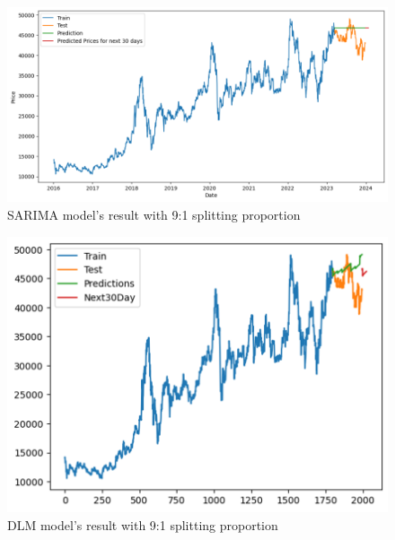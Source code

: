 \documentclass{ieeeojies}
\begin{document}
\begin{figure}[H]
  \centering
  \begin{minipage}{0.8\linewidth}
    \centering
    \includegraphics[width=\linewidth]{bibliography/SARIMA_BIDV91.png}
    \caption{SARIMA model's result with 9:1 splitting proportion}
    \label{fig26}
  \end{minipage}
\end{figure}
\begin{figure}[H]
  \centering
  \begin{minipage}{0.8\linewidth}
    \centering
        \includegraphics[width=\linewidth]{bibliography/BIDV_DLM91.png}
    \caption{DLM model's result with 9:1 splitting proportion}
    \label{fig27}
  \end{minipage}
\end{figure}
\end{document}
